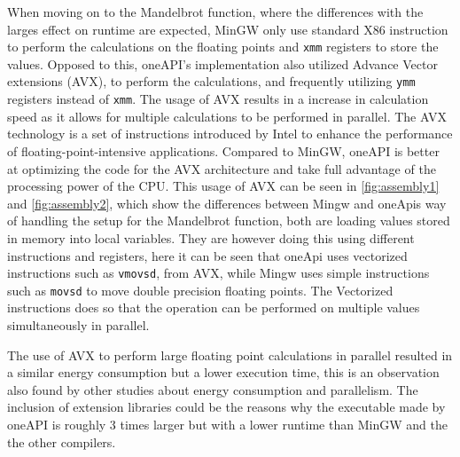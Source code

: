 When moving on to the Mandelbrot function, where the differences with the larges effect on runtime are expected, MinGW only use standard X86 instruction\cite{X86} to perform the calculations on the floating points and \texttt{xmm} registers to store the values. Opposed to this, oneAPI's implementation also utilized Advance Vector extensions (AVX)\cite{AVXIntel}, to perform the calculations, and frequently utilizing \texttt{ymm} registers instead of \texttt{xmm}. The usage of AVX results in a increase in calculation speed as it allows for multiple calculations to be performed in parallel. The AVX technology is a set of instructions introduced by Intel to enhance the performance of floating-point-intensive applications\cite{AVXIntel}. Compared to MinGW, oneAPI is better at optimizing the code for the AVX architecture and take full advantage of the processing power of the CPU. This usage of AVX can be seen in \cref{fig:assembly1} and \cref{fig:assembly2}, which show the differences between Mingw and oneApis way of handling the setup for the Mandelbrot function, both are loading values stored in memory into local variables. They are however doing this using different instructions and registers, here it can be seen that oneApi uses vectorized instructions such as \texttt{vmovsd}, from AVX, while Mingw uses simple instructions such as \texttt{movsd} to move double precision floating points. The Vectorized instructions does so that the operation can be performed on multiple values simultaneously in parallel.

The use of AVX to perform large floating point calculations in parallel resulted in a similar energy consumption but a lower execution time, this is an observation also found by other studies about energy consumption and parallelism\cite{Lindholt2022}.
The inclusion of extension libraries could be the reasons why the executable made by oneAPI is roughly 3 times larger but with a lower runtime than MinGW and the the other compilers.







